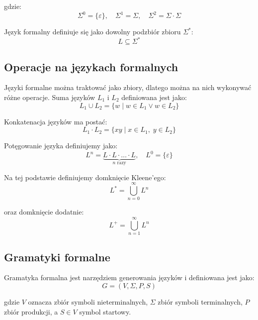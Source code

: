 \documentclass[12pt]{article}
\begin{document}
gdzie:
\begin{equation}
\Sigma^0 = \{\varepsilon\}, \quad \Sigma^1 = \Sigma, \quad \Sigma^2 = \Sigma \cdot \Sigma
\end{equation}

Język formalny definiuje się jako dowolny podzbiór zbioru $\Sigma^*$:
\begin{equation}
L \subseteq \Sigma^*
\end{equation}

\subsection{Operacje na językach formalnych}

Języki formalne można traktować jako zbiory, dlatego można na nich wykonywać różne operacje. Suma języków $L_1$ i $L_2$ definiowana jest jako:
\begin{equation}
L_1 \cup L_2 = \{ w \mid w \in L_1 \lor w \in L_2 \}
\end{equation}

Konkatenacja języków ma postać:
\begin{equation}
L_1 \cdot L_2 = \{ xy \mid x \in L_1, \; y \in L_2 \}
\end{equation}

Potęgowanie języka definiujemy jako:
\begin{equation}
L^n = \underbrace{L \cdot L \cdot \dots \cdot L}_{n \text{ razy}}, \quad L^0 = \{\varepsilon\}
\end{equation}

Na tej podstawie definiujemy domknięcie Kleene’ego:
\begin{equation}
L^* = \bigcup_{n=0}^{\infty} L^n
\end{equation}

oraz domknięcie dodatnie:
\begin{equation}
L^+ = \bigcup_{n=1}^{\infty} L^n
\end{equation}

\subsection{Gramatyki formalne}

Gramatyka formalna jest narzędziem generowania języków i definiowana jest jako:
\begin{equation}
G = (V, \Sigma, P, S)
\end{equation}

gdzie $V$ oznacza zbiór symboli nieterminalnych, $\Sigma$ zbiór symboli terminalnych, $P$ zbiór produkcji, a $S \in V$ symbol startowy.
\end{document}

